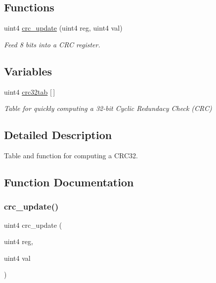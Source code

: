 \subsection*{Functions}
\begin{DoxyCompactItemize}
\item 
uint4 \mbox{\hyperlink{crc32_8hh_a2f8ef4e0e22c330442924367a838a87c}{crc\+\_\+update}} (uint4 reg, uint4 val)
\begin{DoxyCompactList}\small\item\em Feed 8 bits into a C\+RC register. \end{DoxyCompactList}\end{DoxyCompactItemize}
\subsection*{Variables}
\begin{DoxyCompactItemize}
\item 
uint4 \mbox{\hyperlink{crc32_8hh_a4b40516b18f2e8bbf32c619a0d9958d0}{crc32tab}} \mbox{[}$\,$\mbox{]}
\begin{DoxyCompactList}\small\item\em Table for quickly computing a 32-\/bit Cyclic Redundacy Check (C\+RC) \end{DoxyCompactList}\end{DoxyCompactItemize}


\subsection{Detailed Description}
Table and function for computing a C\+R\+C32. 



\subsection{Function Documentation}
\mbox{\label{crc32_8hh_a2f8ef4e0e22c330442924367a838a87c}} 
\subsubsection{\texorpdfstring{crc\_update()}{crc\_update()}}
{\footnotesize\ttfamily uint4 crc\+\_\+update (\begin{DoxyParamCaption}\item[{uint4}]{reg,  }\item[{uint4}]{val }\end{DoxyParamCaption})\hspace{0.3cm}{\ttfamily [inline]}}



